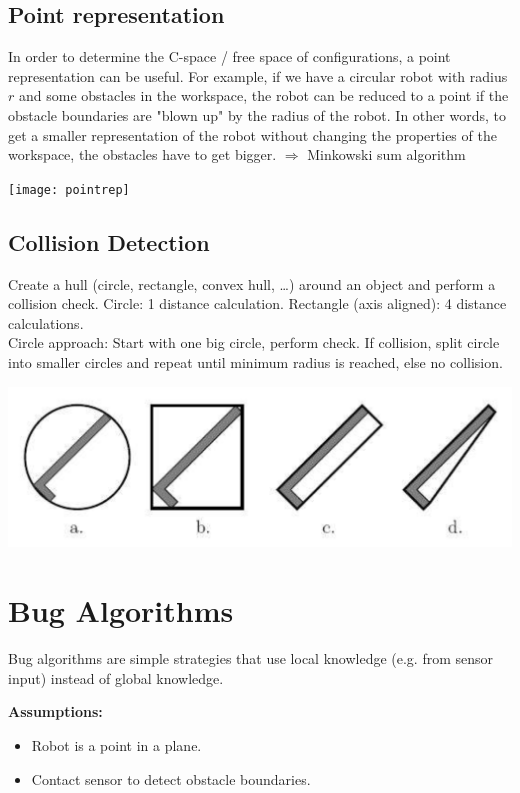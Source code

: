 \begin{multicols*}{2}
\subsection{Point representation}
In order to determine the C-space / free space of configurations, a point representation can be useful. For example, if we have a circular robot with radius $r$ and some obstacles in the workspace, the robot can be reduced to a point if the obstacle boundaries are "blown up" by the radius of the robot. In other words, to get a smaller representation of the robot without changing the properties of the workspace, the obstacles have to get bigger. 
$\Rightarrow$ Minkowski sum algorithm

\begin{center}
\texttt{[image: pointrep]}
\end{center}

\subsection{Collision Detection}
Create a hull (circle, rectangle, convex hull, …) around an object and
perform a collision check. Circle: 1 distance calculation. Rectangle (axis aligned): 4 distance calculations.\\
Circle approach: Start with one big circle, perform check. If collision, split circle into smaller circles and repeat until minimum radius is reached, else no collision.

\begin{center}
\includegraphics[width=\columnwidth]{collision_hull.png}
\end{center}

\section{Bug Algorithms}
Bug algorithms are simple strategies that use local knowledge (e.g. from sensor input) instead of global knowledge.\par

\textbf{Assumptions:}
\begin{itemize}
	\item Robot is a point in a plane.
	\item Contact sensor to detect obstacle boundaries.
\end{itemize}


\end{multicols*}
